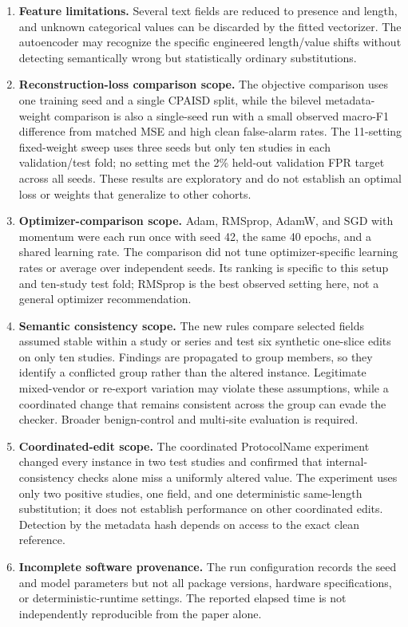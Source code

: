 \documentclass[journal]{IEEEtran}
\begin{document}
\begin{enumerate}[leftmargin=*]
    \item \textbf{Feature limitations.} Several text fields are reduced to presence and length, and unknown categorical values can be discarded by the fitted vectorizer. The autoencoder may recognize the specific engineered length/value shifts without detecting semantically wrong but statistically ordinary substitutions.
    \item \textbf{Reconstruction-loss comparison scope.} The objective comparison uses one training seed and a single CPAISD split, while the bilevel metadata-weight comparison is also a single-seed run with a small observed macro-F1 difference from matched MSE and high clean false-alarm rates. The 11-setting fixed-weight sweep uses three seeds but only ten studies in each validation/test fold; no setting met the 2\% held-out validation FPR target across all seeds. These results are exploratory and do not establish an optimal loss or weights that generalize to other cohorts.
    \item \textbf{Optimizer-comparison scope.} Adam, RMSprop, AdamW, and SGD with momentum were each run once with seed 42, the same 40 epochs, and a shared learning rate. The comparison did not tune optimizer-specific learning rates or average over independent seeds. Its ranking is specific to this setup and ten-study test fold; RMSprop is the best observed setting here, not a general optimizer recommendation.
    \item \textbf{Semantic consistency scope.} The new rules compare selected fields assumed stable within a study or series and test six synthetic one-slice edits on only ten studies. Findings are propagated to group members, so they identify a conflicted group rather than the altered instance. Legitimate mixed-vendor or re-export variation may violate these assumptions, while a coordinated change that remains consistent across the group can evade the checker. Broader benign-control and multi-site evaluation is required.
    \item \textbf{Coordinated-edit scope.} The coordinated ProtocolName experiment changed every instance in two test studies and confirmed that internal-consistency checks alone miss a uniformly altered value. The experiment uses only two positive studies, one field, and one deterministic same-length substitution; it does not establish performance on other coordinated edits. Detection by the metadata hash depends on access to the exact clean reference.
    \item \textbf{Incomplete software provenance.} The run configuration records the seed and model parameters but not all package versions, hardware specifications, or deterministic-runtime settings. The reported elapsed time is not independently reproducible from the paper alone.

\end{enumerate}
\end{document}
